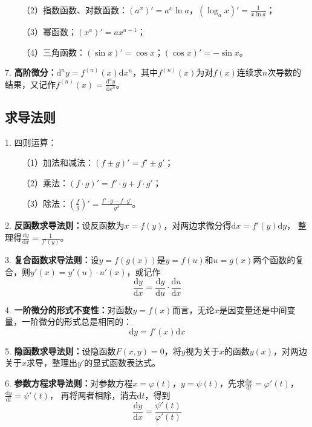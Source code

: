 ~~~~（2）指数函数、对数函数：$\left(a^x\right)'=a^x \ln a$，$\left(\log_a x\right)'=\frac{1}{x\ln a}$；

~~~~（3）幂函数；$\left(x^a\right)'=ax^{a-1}$；

~~~~（4）三角函数：$(\sin x)'=\cos x$；$(\cos x)'=-\sin x$。

7. \textbf{高阶微分：}$\mathrm{d}^n y =f^{(n)}(x)\mathrm{d}x^n$，其中$f^{(n)}(x)$为对$f(x)$连续求$n$次导数的结果，又记作$f^{(n)}(x)=\frac{\mathrm{d}^n y}{\mathrm{d}x^n}$。

\subsection{求导法则}

1. 四则运算：

~~~~（1）加法和减法：$\left(f\pm g\right)'=f' \pm g'$；

~~~~（2）乘法：$(f\cdot g)'=f'\cdot g+f \cdot g'$；

~~~~（3）除法：$\left(\frac{f}{g}\right)'=\frac{f'\cdot g-f\cdot g'}{g^2}$。

2. \textbf{反函数求导法则：}设反函数为$x=f(y)$，对两边求微分得$\mathrm{d}x=f'(y) \mathrm{d}y$，
整理得$\frac{\mathrm{d}y}{\mathrm{d}x}=\frac{1}{f'(y)}$。

3. \textbf{复合函数求导法则：}设$y=f\left(g(x)\right)$是$y=f(u)$和$u=g(x)$两个函数的复合，则$y'(x)=y'(u)\cdot u'(x)$，或记作
\begin{equation*}
    \frac{\mathrm{d}y}{\mathrm{d}x}=\frac{\mathrm{d}y}{\mathrm{d}u}\cdot\frac{\mathrm{d}u}{\mathrm{d}x}
\end{equation*}

4. \textbf{一阶微分的形式不变性：}对函数$y=f(x)$而言，无论$x$是因变量还是中间变量，一阶微分的形式总是相同的：
\begin{equation*}
    \mathrm{d}y=f'(x)\mathrm{d}x
\end{equation*}

5. \textbf{隐函数求导法则：}设隐函数$F(x,y)=0$，将$y$视为关于$x$的函数$y(x)$，对两边关于$x$求导，整理出$y'$的显式函数表达式。

6. \textbf{参数方程求导法则：}对参数方程$x=\varphi(t)$，$y=\psi (t)$，先求$\frac{\mathrm{d}x}{\mathrm{d}t}=\varphi'(t)$，$\frac{\mathrm{d}y}{\mathrm{d}t}=\psi'(t)$，
再将两者相除，消去$\mathrm{d}t$，得到
\begin{equation*}
    \frac{\mathrm{d}y}{\mathrm{d}x}=\frac{\psi'(t)}{\varphi'(t)}
\end{equation*}

